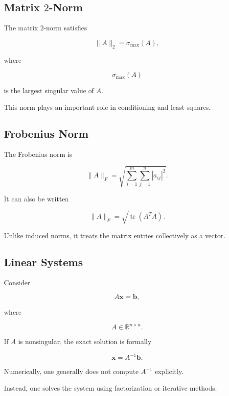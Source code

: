 \subsection{Matrix \(2\)-Norm}
\label{subsec:matrix-two-norm}

The matrix \(2\)-norm satisfies

\[
\boxed{
\|A\|_2
=
\sigma_{\max}(A),
}
\]

where

\[
\sigma_{\max}(A)
\]

is the largest singular value of \(A\).

This norm plays an important role in conditioning and least squares.

\subsection{Frobenius Norm}
\label{subsec:frobenius-norm}

The Frobenius norm is

\[
\boxed{
\|A\|_F
=
\sqrt{
\sum_{i=1}^{m}
\sum_{j=1}^{n}
|a_{ij}|^2
}.
}
\]

It can also be written

\[
\boxed{
\|A\|_F
=
\sqrt{
\operatorname{tr}(A^TA)
}.
}
\]

Unlike induced norms, it treats the matrix entries collectively as a
vector.

\subsection{Linear Systems}
\label{subsec:numerical-linear-systems}

Consider

\[
\boxed{
A\mathbf{x}
=
\mathbf{b},
}
\]

where

\[
A\in\mathbb{R}^{n\times n}.
\]

If \(A\) is nonsingular, the exact solution is formally

\[
\mathbf{x}
=
A^{-1}\mathbf{b}.
\]

Numerically, one generally does not compute \(A^{-1}\) explicitly.

Instead, one solves the system using factorization or iterative methods.

